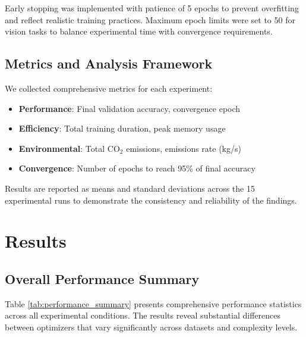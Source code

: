 \documentclass[conference]{IEEEtran}
\begin{document}
Early stopping was implemented with patience of 5 epochs to prevent overfitting and reflect realistic training practices. Maximum epoch limits were set to 50 for vision tasks to balance experimental time with convergence requirements.

\subsection{Metrics and Analysis Framework}

We collected comprehensive metrics for each experiment:

\begin{itemize}
    \item \textbf{Performance}: Final validation accuracy, convergence epoch
    \item \textbf{Efficiency}: Total training duration, peak memory usage
    \item \textbf{Environmental}: Total CO$_2$ emissions, emissions rate (kg/s)
    \item \textbf{Convergence}: Number of epochs to reach 95\% of final accuracy
\end{itemize}

Results are reported as means and standard deviations across the 15 experimental runs to demonstrate the consistency and reliability of the findings.

\section{Results}

\subsection{Overall Performance Summary}

Table \ref{tab:performance_summary} presents comprehensive performance statistics across all experimental conditions. The results reveal substantial differences between optimizers that vary significantly across datasets and complexity levels.
\end{document}

